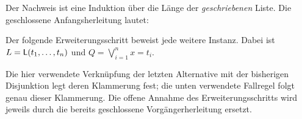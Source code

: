 Der Nachweis ist eine Induktion über die Länge der \emph{geschriebenen}
Liste. Die geschlossene Anfangsherleitung lautet:
\begin{tabproofwide}
  \proofstepwidestar[5]{\bot}{\rA}
\end{tabproofwide}
Der folgende Erweiterungsschritt beweist jede weitere Instanz. Dabei ist
\(L=\mathsf L(t_1,\ldots,t_n)\) und \(Q=\bigvee_{i=1}^n x=t_i\).
\begin{tabproofwide}
\end{tabproofwide}
Die hier verwendete Verknüpfung der letzten Alternative mit der
bisherigen Disjunktion legt deren Klammerung fest; die unten verwendete
Fallregel folgt genau dieser Klammerung. Die offene Annahme des
Erweiterungsschritts wird jeweils durch die bereits geschlossene
Vorgängerherleitung ersetzt.

